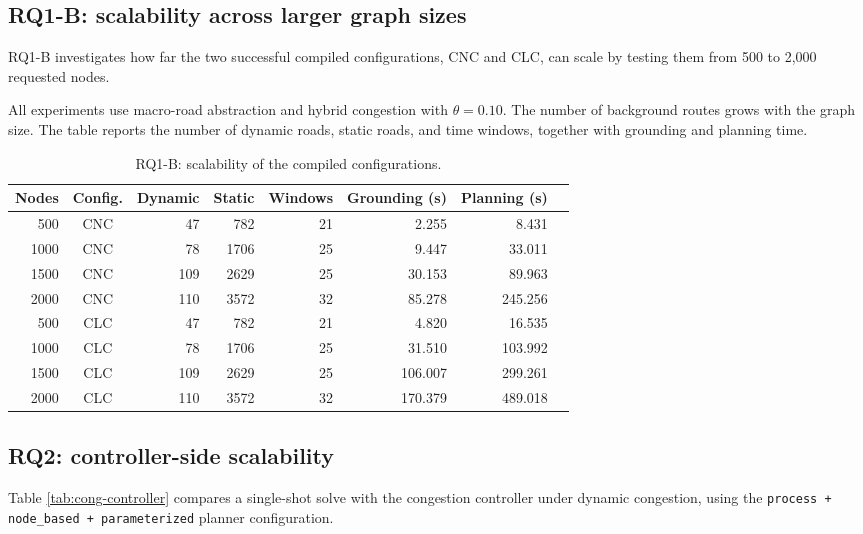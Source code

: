 \documentclass[10pt]{article}
\begin{document}
\subsection{RQ1-B: scalability across larger graph sizes}
RQ1-B investigates how far the two successful compiled configurations, CNC and CLC, can scale by testing them from 500 to 2,000 requested nodes.

All experiments use macro-road abstraction and hybrid congestion with
$\theta=0.10$. The number of background routes grows with the graph size.
The table reports the number of dynamic roads, static roads, and time windows,
together with grounding and planning time.



\begin{table}[H]
\centering
\caption{RQ1-B: scalability of the compiled configurations.}
\label{tab:rq1-b}
\scriptsize

\begin{tabular}{@{}rcrrrrrl@{}}
\toprule
Nodes & Config. & Dynamic & Static & Windows
& Grounding (s) & Planning (s) \\
\midrule
500  & CNC & 47  & 782  & 21 & 2.255   & 8.431    \\
1000 & CNC & 78  & 1706 & 25 & 9.447   & 33.011  \\
1500 & CNC & 109 & 2629 & 25 & 30.153  & 89.963  \\
2000 & CNC & 110 & 3572 & 32 & 85.278  & 245.256  \\
\midrule
500  & CLC & 47  & 782  & 21 & 4.820   & 16.535   \\
1000 & CLC & 78  & 1706 & 25 & 31.510  & 103.992  \\
1500 & CLC & 109 & 2629 & 25 & 106.007 & 299.261  \\
2000 & CLC & 110 & 3572 & 32 & 170.379 & 489.018  \\
\bottomrule
\end{tabular}
\end{table}




\subsection{RQ2: controller-side scalability}
Table \ref{tab:cong-controller} compares a single-shot solve with the congestion
controller under dynamic congestion, using the
\texttt{process + node\_based + parameterized} planner configuration.
\end{document}
